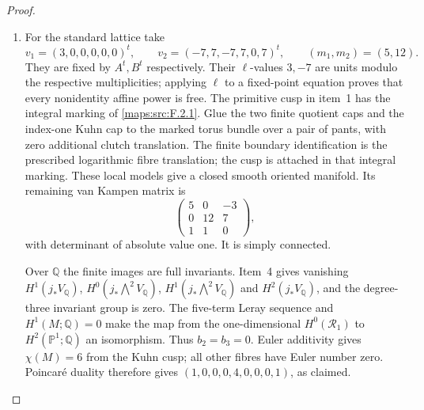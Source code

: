 \begin{proof}
\begin{enumerate}[label={$\langle1\rangle$\arabic*.}]
\item For the standard lattice take
\[
 v_1=(3,0,0,0,0,0)^t,\qquad
 v_2=(-7,7,-7,7,0,7)^t,\qquad (m_1,m_2)=(5,12).
\]
They are fixed by $A^t,B^t$ respectively.
Their $\ell$-values $3,-7$ are units modulo the respective
multiplicities; applying $\ell$ to a fixed-point equation proves
that every nonidentity affine power is free.
The primitive cusp in item~1 has the integral marking of
\cref{maps:src:F.2.1}.  Glue the two finite quotient caps and
the index-one Kuhn cap to the marked torus bundle over a pair
of pants, with zero additional clutch translation.  The finite
boundary identification is the prescribed logarithmic fibre
translation; the cusp is attached in that integral marking.
These local models give a closed smooth oriented
manifold.  Its remaining van Kampen matrix is
\[
 \begin{pmatrix}5&0&-3\\0&12&7\\1&1&0\end{pmatrix},
\]
with determinant of absolute value one.  It is simply connected.

Over $\mathbb Q$ the finite images are full invariants.
Item~4 gives vanishing $H^1(j_*V_{\mathbb Q})$,
$H^0(j_*\bigwedge^2V_{\mathbb Q})$,
$H^1(j_*\bigwedge^2V_{\mathbb Q})$ and
$H^2(j_*V_{\mathbb Q})$, and the degree-three invariant group
is zero.  The five-term Leray sequence and $H^1(M;\mathbb Q)=0$
make the map from the one-dimensional $H^0(\mathcal R_1)$ to
$H^2(\mathbb P^1;\mathbb Q)$ an isomorphism.
Thus $b_2=b_3=0$.
Euler additivity gives $\chi(M)=6$ from the Kuhn cusp;
all other fibres have Euler number zero.
Poincar\'e duality therefore gives
$(1,0,0,0,4,0,0,0,1)$, as claimed.
\end{enumerate}
\end{proof}




